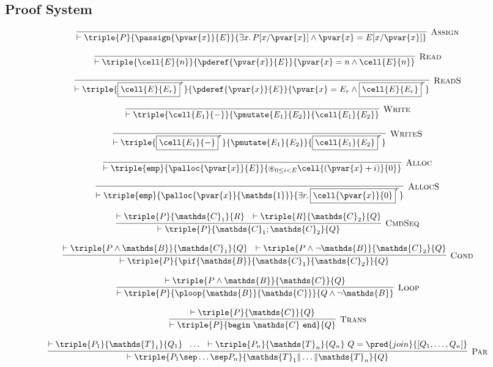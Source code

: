 \subsection{Proof System}

\[
\infer[\textsc{Assign}]
{
	\vdash \triple
	{P}
	{\passign{\pvar{x}}{E}}
	{\exists x\ldotp P[x/\pvar{x}] \land \pvar{x} = E[x/\pvar{x}]}
}
{}
\]

\[
\infer[\textsc{Read}]
{
	\vdash \triple
	{\cell{E}{n}}
	{\pderef{\pvar{x}}{E}}
	{\pvar{x} = n \land \cell{E}{n}}
}
{}
\]

\[
\infer[\textsc{ReadS}]
{
	\vdash \triple
	{\boxed{\cell{E}{E_r}}^r}
	{\pderef{\pvar{x}}{E}}
	{\pvar{x} = E_r \land \boxed{\cell{E}{E_r}}^r}
}
{}
\]

\[
\infer[\textsc{Write}]
{
	\vdash \triple
	{\cell{E_1}{-}}
	{\pmutate{E_1}{E_2}}
	{\cell{E_1}{E_2}}
}
{}
\]

\[
\infer[\textsc{WriteS}]
{
	\vdash \triple
	{\boxed{\cell{E_1}{-}}^r}
	{\pmutate{E_1}{E_2}}
	{\boxed{\cell{E_1}{E_2}}^r}
}
{}
\]

\[
\infer[\textsc{Alloc}]
{
	\vdash \triple
	{\mathtt{emp}}
	{\palloc{\pvar{x}}{E}}
	{\circledast_{0 \leq i < E}\cell{(\pvar{x} + i)}{0}}
}
{}
\]

\[
\infer[\textsc{AllocS}]
{
	\vdash \triple
	{\mathtt{emp}}
	{\palloc{\pvar{x}}{\mathds{1}}}
	{\exists r \ldotp \boxed{\cell{\pvar{x}}{0}}^r}
}
{}
\]

\[
\infer[\textsc{CmdSeq}]
{
	\vdash \triple
	{P}
	{\mathds{C}_1; \mathds{C}_2}
	{Q}
}
{
	\vdash \triple
	{P}
	{\mathds{C}_1}
	{R}\ \
	\vdash \triple
	{R}
	{\mathds{C}_2}
	{Q}
}
\]

\[
\infer[\textsc{Cond}]
{
	\vdash \triple
	{P}
	{\pif{\mathds{B}}{\mathds{C}_1}{\mathds{C}_2}}
	{Q}
}
{
	\vdash \triple
	{P \land \mathds{B}}
	{\mathds{C}_1}
	{Q}\ \
	\vdash \triple
	{P \land \lnot \mathds{B}}
	{\mathds{C}_2}
	{Q}
}
\]

\[
\infer[\textsc{Loop}]
{
	\vdash \triple
	{P}
	{\ploop{\mathds{B}}{\mathds{C}}}
	{Q \land \lnot \mathds{B}}
}
{
	\vdash \triple
	{P \land \mathds{B}}
	{\mathds{C}}
	{Q}
}
\]

\[
\infer[\textsc{Trans}]
{
	\vdash \triple
	{P}
	{\mathtt{begin}\ \mathds{C}\ \mathtt{end}}
	{Q}
}
{
	\vdash \triple
	{P}
	{\mathds{C}}
	{Q}
}
\]

\[
\infer[\textsc{Par}]
{
	\vdash \triple
	{P_1 \sep \ldots \sep P_n}
	{\mathds{T}_1 \| \ldots \| \mathds{T}_n}
	{Q}
}
{
	\vdash \triple
	{P_1}
	{\mathds{T}_1}
	{Q_1}\ \
	\ldots\ \
	\vdash \triple
	{P_n}
	{\mathds{T}_n}
	{Q_n}\
	Q = \pred{join}{[Q_1, \ldots, Q_n]}
}
\]

